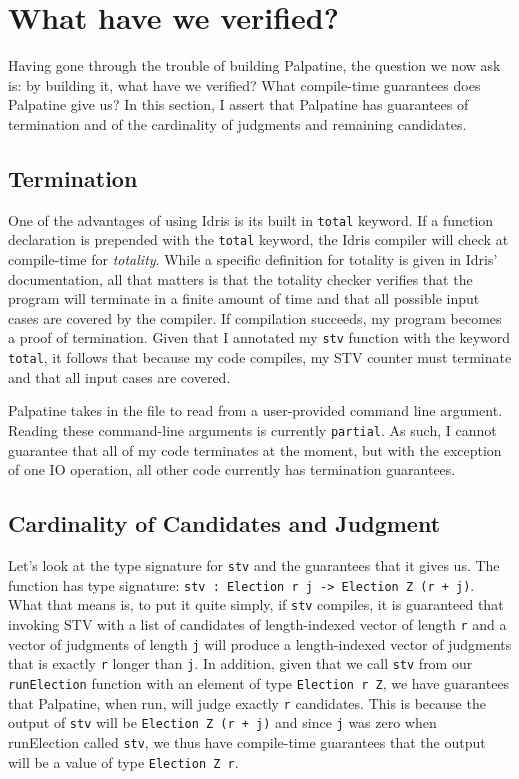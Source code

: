 \section{What have we verified?}

Having gone through the trouble of building Palpatine, the question we
now ask is: by building it, what have we verified? What compile-time guarantees
does Palpatine give us? In this section, I assert that Palpatine has
guarantees of termination and of the cardinality of judgments and remaining
candidates. 

\subsection{Termination}

One of the advantages of using Idris is its built in \texttt{total} keyword. If
a function declaration is prepended with the \texttt{total} keyword, the Idris
compiler will check at compile-time for \textit{totality}. While a specific
definition for totality is given in Idris' documentation, all that matters is
that the totality checker verifies that the program will terminate in a finite
amount of time and that all possible input cases are covered by the compiler. If
compilation succeeds, my program becomes a proof of termination. Given that I
annotated my \texttt{stv} function with the keyword \texttt{total}, it follows
that because my code compiles, my STV counter must terminate and that all input
cases are covered. 

Palpatine takes in the file to read from a user-provided command line argument.
Reading these command-line arguments is currently \texttt{partial}. As such, I
cannot guarantee that all of my code terminates at the moment, but with the
exception of one IO operation, all other code currently has termination
guarantees. 

\subsection{Cardinality of Candidates and Judgment}

Let's look at the type signature for \texttt{stv} and the guarantees that it
gives us. The function has type signature: \texttt{stv : Election r j ->
Election Z (r + j)}. What that means is, to put it quite simply, if \texttt{stv}
compiles, it is guaranteed that invoking STV with a list of candidates of
length-indexed vector of length \texttt{r} and a vector of judgments of length
\texttt{j} will produce a length-indexed vector of judgments that is exactly \texttt{r}
longer than \texttt{j}. In addition, given that we call \texttt{stv} from our
\texttt{runElection} function with an element of type \texttt{Election r Z}, we
have guarantees that Palpatine, when run, will judge exactly \texttt{r}
candidates. This is because the output of \texttt{stv} will be \texttt{Election
Z (r + j)} and since \texttt{j} was zero when runElection called \texttt{stv},
we thus have compile-time guarantees that the output will be a value of type
\texttt{Election Z r}. 


